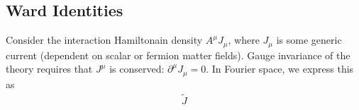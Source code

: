 \documentclass{article}
\numberwithin{equation}{section}
\begin{document}
\subsection{Ward Identities}

Consider the interaction Hamiltonain density $A^\mu J_\mu$, where $J_\mu$ is some generic current (dependent on scalar or fermion matter fields). Gauge invariance of the theory requires that $J^\mu$ is conserved: $\partial^\mu J_\mu = 0$. In Fourier space, we express this as 
\begin{gather}
    \tilde{J}
\end{gather}
\end{document}
